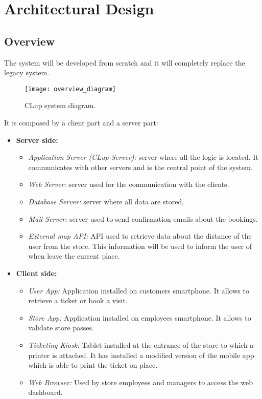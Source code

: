 \chapter{Architectural Design}

\section{Overview}
The system will be developed from scratch and it will completely replace the legacy system. \newline

\vspace{0.8em}
\begin{figure}[H]
	\centering
	\texttt{[image: overview\_diagram]}
	\caption{CLup system diagram.}
\end{figure}


It is composed by a client part and a server part:
\begin{itemize}
	\item \textbf{Server side:}
	\begin{itemize}
		\item \textit{Application Server (CLup Server):} server where all the logic is located. It communicates with other servers and is the central point of the system.
		\item \textit{Web Server:} server used for the communication with the clients.
		\item \textit{Database Server:} server where all data are stored.
		\item \textit{Mail Server:} server used to send confirmation emails about the bookings.
		\item \textit{External map API:} API used to retrieve data about the distance of the user from the store. This information will be used to inform the user of when leave the current place.
	\end{itemize}
	\item \textbf{Client side:}
	\begin{itemize}
		\item \textit{User App:} Application installed on customers smartphone. It allows to retrieve a ticket or book a visit.
		\item \textit{Store App:} Application installed on employees smartphone. It allows to validate store passes.
		\item \textit{Ticketing Kiosk:} Tablet installed at the entrance of the store to which a printer is attached. It has installed a modified version of the mobile app which is able to print the ticket on place.
		\item \textit{Web Browser:} Used by store employees and managers to access the web dashboard.
	\end{itemize}
\end{itemize}

